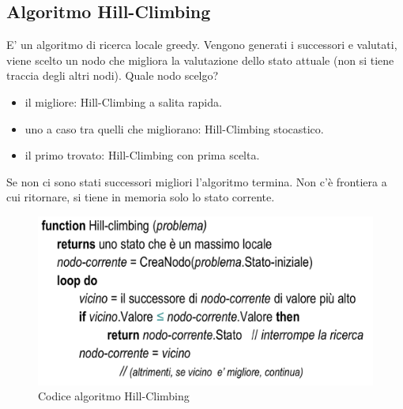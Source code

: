 \documentclass{article}
\begin{document}
\subsection{Algoritmo Hill-Climbing}
E' un algoritmo di ricerca locale greedy. Vengono generati i successori e valutati, viene scelto un nodo che migliora la valutazione dello stato attuale (non si tiene traccia degli altri nodi). Quale nodo scelgo?
\begin{itemize}
    \item il migliore: Hill-Climbing a salita rapida.
    \item uno a caso tra quelli che migliorano: Hill-Climbing stocastico.
    \item il primo trovato: Hill-Climbing con prima scelta.
\end{itemize}
Se non ci sono stati successori migliori l'algoritmo termina. Non c'è frontiera a cui ritornare, si tiene in memoria solo lo stato corrente.
\begin{figure}[H]
    \centering
    \includegraphics[scale=0.4]{Images/hillclimbing.png}
    \caption{Codice algoritmo Hill-Climbing}
\end{figure}
\end{document}
